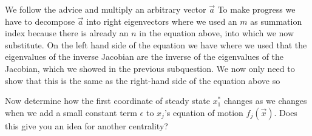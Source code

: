 \solution 
We follow the advice and multiply an arbitrary vector $\vec{a}$
To make progress we have to decompose $\vec{a}$ into right eigenvectors 
where we used an $m$ as summation index because there is already an $n$ in the equation above, into which we now substitute. On the left hand side of the equation we have 
where we used that the eigenvalues of the inverse Jacobian are the inverse of the eigenvalues of the Jacobian, which we showed in the previous subquestion.
We now only need to show that this is the same as the right-hand side of the equation above so 

\subquestion 
Now determine how the first coordinate of steady state $x_1^*$ changes as we changes when we add a small constant term $\epsilon$ to $x_j$'s equation of motion  $f_j(\vec{x})$. Does this give you an idea for another centrality?  


